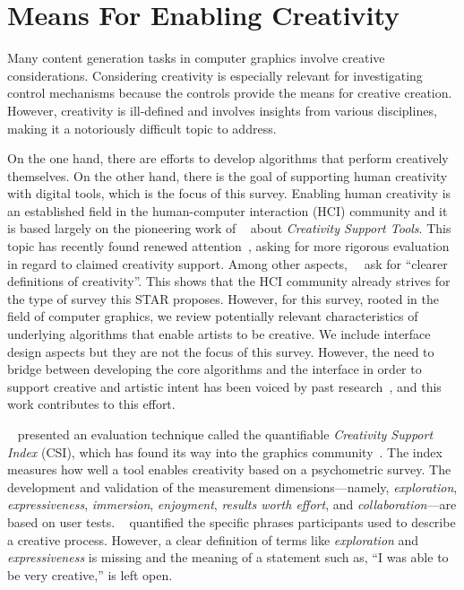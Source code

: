 

\section{Means For Enabling Creativity}\label{sec:creativ_means}

Many content generation tasks in computer graphics involve creative considerations. Considering creativity is especially relevant for investigating control mechanisms because the controls provide the means for creative creation. However, creativity is ill-defined and involves insights from various disciplines, making it a notoriously difficult topic to address.

On the one hand, there are efforts to develop algorithms that perform creatively themselves. On the other hand, there is the goal of supporting human creativity with digital tools, which is the focus of this survey. Enabling human creativity is an established field in the human-computer interaction (HCI) community and it is based largely on the pioneering work of \citeauthor*{shneiderman_2007_cst}~\cite{shneiderman_2007_cst} about \textit{Creativity Support Tools}. This topic has recently found renewed attention~\cite{frich_2018_tyo, frich_2019_mtl, remy_2020_ecs}, asking for more rigorous evaluation in regard to claimed creativity support. Among other aspects,~\citeauthor*{frich_2018_tyo}~\cite{frich_2018_tyo} ask for ``clearer definitions of creativity''. This shows that the HCI community already strives for the type of survey this STAR proposes. However, for this survey, rooted in the field of computer graphics, we review potentially relevant characteristics of underlying algorithms that enable artists to be creative. We include interface design aspects but they are not the focus of this survey. However, the need to bridge between developing the core algorithms and the interface in order to support creative and artistic intent has been voiced by past research~\cite{deterding_2017_mci,isenberg_2016_inw, salesin_2002_nar}, and this work contributes to this effort.

\citeauthor*{cherry_2014_qcs}~\cite{cherry_2014_qcs} presented an evaluation technique called the quantifiable \textit{Creativity Support Index} (CSI), which has found its way into the graphics community~\cite{shugrina_2017_ppi}. The index measures how well a tool enables creativity based on a psychometric survey. The development and validation of the measurement dimensions---namely, \textit{exploration}, \textit{expressiveness}, \textit{immersion}, \textit{enjoyment}, \textit{results worth effort}, and \textit{collaboration}---are based on user tests. \citeauthor*{cherry_2014_qcs}~\cite{cherry_2014_qcs} quantified the specific phrases participants used to describe a creative process. However, a clear definition of terms like \textit{exploration} and \textit{expressiveness} is missing and the meaning of a statement such as, ``I was able to be very creative,'' is left open. 

